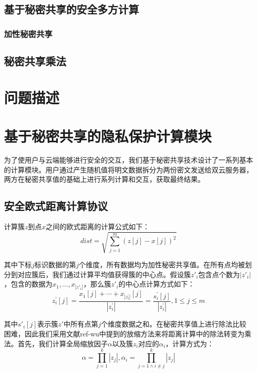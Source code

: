 \subsection{基于秘密共享的安全多方计算}
\subsubsection{加性秘密共享}

\subsection{秘密共享乘法}

\section{问题描述}
\label{s3-wenti}

\section{基于秘密共享的隐私保护计算模块}
\label{s3-mokuai}
为了使用户与云端能够进行安全的交互，我们基于秘密共享技术设计了一系列基本的计算模块。用户通过产生随机值将明文数据拆分为两份密文发送给双云服务器，两方在秘密共享值的基础上进行系列计算和交互，获取最终结果。

\subsection{安全欧式距离计算协议}

计算簇$z$到点$x$之间的欧式距离的计算公式如下：
\begin{equation}
    \label{cal_dist}
    dist=\sqrt{\sum_{j=1}^m\left(z[j]-x[j]\right)^2}
\end{equation}

其中下标$j$标识数据的第$j$个维度，所有数据均为加性秘密共享值。在所有点均被划分到对应簇后，我们通过计算平均值获得簇的中心点。假设簇$z'_i$包含点个数为$|z'_i|$，包含的数据为${x_1,...,x_{|z'_i|}}$，那么簇$z'_i$的中心点计算方式如下：
\begin{equation}
    \label{cal_center}
    z_{i}^{\prime}[j]=\frac{x_{1}[j]+\cdots+x_{\left|z_{i}^{\prime}\right|}[j]}{\left|z_{i}^{\prime}\right|}=\frac{s_{i}^{\prime}[j]}{\left|z_{i}^{\prime}\right|}, 1 \leq j \leq m
\end{equation}

其中$s'_i[j]$表示簇$z'$中所有点第$j$个维度数据之和。在秘密共享值上进行除法比较困难，因此我们采用文献ref-wu中提到的放缩方法来将距离计算中的除法转变为乘法。首先，我们计算全局缩放因子$\alpha$以及簇$z_i$对应的$\alpha_i$，计算方式为：
\begin{equation}
    \label{cal_scale}
    \alpha=\prod_{j=1}^{k}\left|z_{j}\right|, \alpha_{i}=\prod_{j=1 \wedge i \neq j}^{k}\left|z_{j}\right|
\end{equation}

